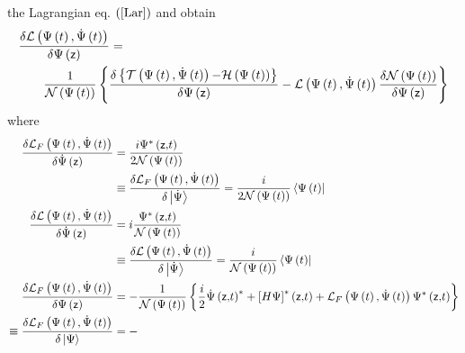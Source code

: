 \documentclass[aps,preprint]{revtex4}
\begin{document}
the Lagrangian eq. $\left( \ref{Lar}\right) $ and obtain 
\begin{align}
& \frac{\delta\mathcal{L}\left( \Psi\left( t\right) ,\dot{\Psi}\left(
t\right) \right) }{\delta\Psi\left( \mathsf{z}\right) }=  \notag \\
& \qquad\frac{1}{\mathcal{N}\left( \Psi\left( t\right) \right) }\left\{ 
\frac{\delta\left\{ \mathcal{T}\left( \Psi\left( t\right) ,\dot{\Psi }\left(
t\right) \right) \mathcal{-H}\left( \Psi\left( t\right) \right) \right\} }{%
\delta\Psi\left( \mathsf{z}\right) }-\mathcal{L}\left( \Psi\left( t\right) ,%
\dot{\Psi}\left( t\right) \right) \frac {\delta\mathcal{N}\left( \Psi\left(
t\right) \right) }{\delta\Psi\left( \mathsf{z}\right) }\right\}
\end{align}
where%
\begin{align}
\frac{\delta\mathcal{L}_{F}\left( \Psi\left( t\right) ,\dot{\Psi}\left(
t\right) \right) }{\delta\dot{\Psi}\left( \mathsf{z}\right) } & =\frac{%
i\Psi^{\ast}\left( \mathsf{z,}t\right) }{2\mathcal{N}\left( \Psi\left(
t\right) \right) }  \notag \\
& \equiv\frac{\delta\mathcal{L}_{F}\left( \Psi\left( t\right) ,\dot{\Psi }%
\left( t\right) \right) }{\delta\left| \dot{\Psi}\right\rangle }=\frac {i}{2%
\mathcal{N}\left( \Psi\left( t\right) \right) }\left\langle \Psi\left(
t\right) \right| \\
\frac{\delta\mathcal{L}\left( \Psi\left( t\right) ,\dot{\Psi}\left( t\right)
\right) }{\delta\dot{\Psi}\left( \mathsf{z}\right) } & =i\frac{%
\Psi^{\ast}\left( \mathsf{z,}t\right) }{\mathcal{N}\left( \Psi\left(
t\right) \right) }  \notag \\
& \equiv\frac{\delta\mathcal{L}\left( \Psi\left( t\right) ,\dot{\Psi }\left(
t\right) \right) }{\delta\left| \dot{\Psi}\right\rangle }=\frac {i}{\mathcal{%
N}\left( \Psi\left( t\right) \right) }\left\langle \Psi\left( t\right)
\right| \\
\frac{\delta\mathcal{L}_{F}\left( \Psi\left( t\right) ,\dot{\Psi}\left(
t\right) \right) }{\delta\Psi\left( \mathsf{z}\right) } & =-\frac {1}{%
\mathcal{N}\left( \Psi\left( t\right) \right) }\left\{ \frac{i}{2}\dot{\Psi}%
\left( \mathsf{z,}t\right) ^{\ast}+\left[ H\Psi\right] ^{\ast}\left( \mathsf{%
z,}t\right) +\mathcal{L}_{F}\left( \Psi\left( t\right) ,\dot{\Psi}\left(
t\right) \right) \Psi^{\ast}\left( \mathsf{z,}t\right) \right\}  \notag \\
\left. \equiv\right. \frac{\delta\mathcal{L}_{F}\left( \Psi\left( t\right) ,%
\dot{\Psi}\left( t\right) \right) }{\delta\left| \Psi \right\rangle } & =-%

\end{align}
\end{document}
